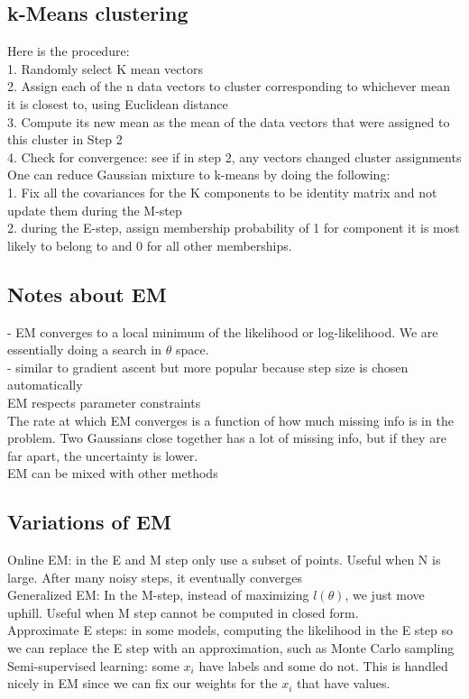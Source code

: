 \documentclass[11pt,psfig]{article}
\begin{document}
\subsection*{k-Means clustering}

Here is the procedure:\\
1. Randomly select K mean vectors\\
2. Assign each of the n data vectors to cluster corresponding to whichever mean it is closest to, using Euclidean distance\\
3. Compute its new mean as the mean of the data vectors that were assigned to this cluster in Step 2\\
4. Check for convergence: see if in step 2, any vectors changed cluster assignments\\
One can reduce Gaussian mixture to k-means by doing the following:\\
1. Fix all the covariances for the K components to be identity matrix and not update them during the M-step\\
2. during the E-step, assign membership probability of 1 for component it is most likely to belong to and 0 for all other memberships. 


\subsection*{Notes about EM}

- EM converges to a local minimum of the likelihood or log-likelihood. We are essentially doing a search in $\theta$ space. 
\\
- similar to gradient ascent but more popular because step size is chosen automatically
\\
EM respects parameter constraints
\\
The rate at which EM converges is a function of how much missing info is in the problem. Two Gaussians close together has a lot of missing info, but if they are far apart, the uncertainty is lower.
\\
EM can be mixed with other methods

\subsection*{Variations of EM}

Online EM: in the E and M step only use a subset of points. Useful when N is large. After many noisy steps, it eventually converges
\\
Generalized EM: In the M-step, instead of maximizing $l(\theta)$, we just move uphill. Useful when M step cannot be computed in closed form. 
\\
Approximate E steps: in some models, computing the likelihood in the E step so we can replace the E step with an approximation, such as Monte Carlo sampling
\\
Semi-supervised learning: some $x_i$ have labels and some do not. This is handled nicely in EM since we can fix our weights for the $x_i$ that have values. 
\end{document}
